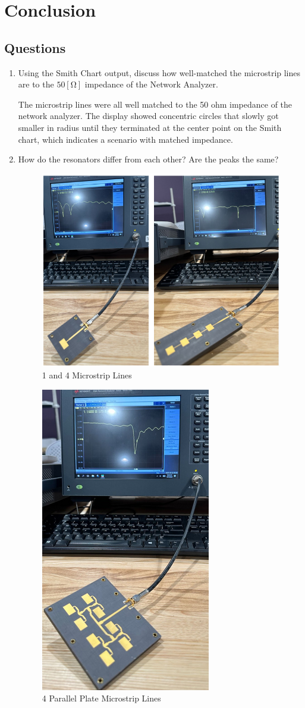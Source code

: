 \documentclass[
	letterpaper, %
	10pt, %
]{CSUniSchoolLabReport}
\begin{document}
\section{Conclusion}

\subsection{Questions}

\begin{enumerate}

  \item Using the Smith Chart output, discuss how well-matched the microstrip lines are to the $50[\si{\ohm}]$ impedance of the Network Analyzer.

    The microstrip lines were all well matched to the 50 ohm impedance of the network analyzer. The display showed concentric circles that slowly got smaller in radius until they terminated at the center point on the Smith chart, which indicates a scenario with matched impedance.

  \item How do the resonators differ from each other? Are the peaks the same?

    \begin{figure}[H]
      \centering
      \includegraphics[width=.5\textwidth]{Figures/Lab Three/Peaks-1-4.png}
      \caption{1 and 4 Microstrip Lines}
      \label{fig:5}
    \end{figure}

    \begin{figure}[H]
      \centering
      \includegraphics[width=.3\textwidth]{Figures/Lab Three/Peaks-4x2.png}
      \caption{4 Parallel Plate Microstrip Lines}
      \label{fig:6}
    \end{figure}


\end{enumerate}
\end{document}
